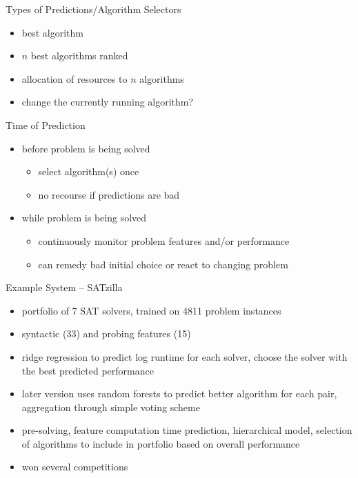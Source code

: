 \begin{frame}{Types of Predictions/Algorithm Selectors}
\begin{itemize}
\item best algorithm
\item $n$ best algorithms ranked
\item allocation of resources to $n$ algorithms
\item change the currently running algorithm?
\end{itemize}
\end{frame}

\begin{frame}{Time of Prediction}
\begin{itemize}
\item before problem is being solved
    \begin{itemize}
    \item select algorithm(s) once
    \item no recourse if predictions are bad
    \end{itemize}
\item while problem is being solved
    \begin{itemize}
    \item continuously monitor problem features and/or performance
    \item can remedy bad initial choice or react to changing problem
    \end{itemize}
\end{itemize}
\end{frame}

\begin{frame}{Example System -- SATzilla}
\begin{itemize}
\item portfolio of 7 SAT solvers, trained on 4811 problem instances
\item syntactic (33) and probing features (15)
\item ridge regression to predict log runtime for each solver, choose the solver with the best predicted performance
\item later version uses random forests to predict better algorithm for each
 pair, aggregation through simple voting scheme
\item pre-solving, feature computation time prediction, hierarchical model,
selection of algorithms to include in portfolio based on overall performance
\item won several competitions
\end{itemize}
\end{frame}

